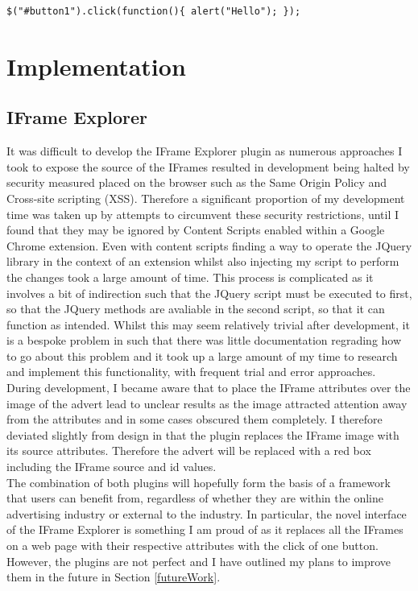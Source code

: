 \documentclass[12pt]{article}
\begin{document}
\begin{lstlisting}[caption=Setting the onClick functionality of button in JQuery, label={jqExample}]
$("#button1").click(function(){ alert("Hello"); });
\end{lstlisting}

\section{Implementation}

\subsection{IFrame Explorer}
It was difficult to develop the IFrame Explorer plugin as numerous approaches I took to expose the source of the IFrames resulted in development being halted by security measured  placed on the browser such as the Same Origin Policy and Cross-site scripting (XSS). Therefore a significant proportion of my development time was taken up by attempts to circumvent these security restrictions, until I found that they may be ignored by Content Scripts enabled within a Google Chrome extension. Even with content scripts finding a way to operate the JQuery library in the context of an extension whilst also injecting my script to perform the changes took a large amount of time. This process is complicated as it involves a bit of indirection such that the JQuery script must be executed to first, so that the JQuery methods are avaliable in the second script, so that it can function as intended. Whilst this may seem relatively trivial after development, it is a bespoke problem in such that there was little documentation regrading how to go about this problem and it took up a large amount of my time to research and implement this functionality, with frequent trial and error approaches. \\

During development, I became aware that to place the IFrame attributes over the image of the advert lead to unclear results as the image attracted attention away from the attributes and in some cases obscured them completely. I therefore deviated slightly from design in that the plugin replaces the IFrame image with its source attributes. Therefore the advert will be replaced with a red box including the IFrame source and id values. \\

The combination of both plugins will hopefully form the basis of a framework that users can benefit from, regardless of whether they are within the online advertising industry or external to the industry. In particular, the novel interface of the IFrame Explorer is something I am proud of as it replaces all the IFrames on a web page with their respective attributes with the click of one button. However, the plugins are not perfect and I have outlined my plans to improve them in the future in Section \ref{futureWork}.  
\end{document}
